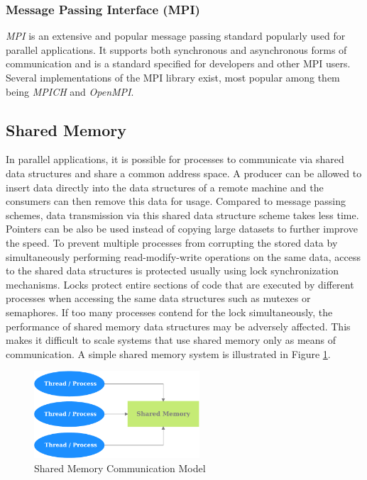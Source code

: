 \documentclass[11pt]{book}
\begin{document}
\subsubsection{Message Passing Interface (MPI)}\label{subsec:mpi}

\emph{MPI} \cite{gropp-94} is an extensive and popular message passing standard popularly used for parallel
applications.  It supports both synchronous and asynchronous forms of communication and is a standard
specified for developers and other MPI users.  Several implementations of the MPI library exist, most popular
among them being \emph{MPICH} and \emph{OpenMPI}.

\subsection{Shared Memory}\label{subsec:shared_memory}

In parallel applications, it is possible for processes to communicate via shared data structures and share a
common address space.  A producer can be allowed to insert data directly into the data structures of a remote
machine and the consumers can then remove this data for usage.  Compared to message passing schemes, data
transmission via this shared data structure scheme takes less time.  Pointers can be also be used instead of
copying large datasets to further improve the speed.  To prevent multiple processes from corrupting the stored
data by simultaneously performing read-modify-write operations on the same data, access to the shared data
structures is protected usually using lock synchronization mechanisms.  Locks protect entire sections of code
that are executed by different processes when accessing the same data structures such as mutexes or
semaphores.  If too many processes contend for the lock simultaneously, the performance of shared memory data
structures may be adversely affected.  This makes it difficult to scale systems that use shared memory only as
means of communication. A simple shared memory system is illustrated in Figure \ref{fig:shared_memory}.

\begin{figure}
    \centering
    \includegraphics[width=0.55\textwidth]{figures/shared_memory.pdf}
    \caption{Shared Memory Communication Model}\label{fig:shared_memory}
\end{figure}
\end{document}

